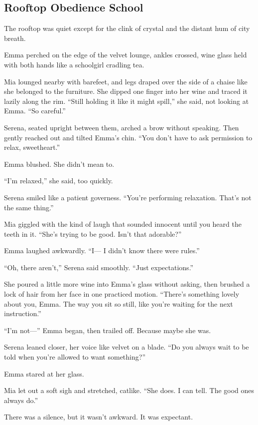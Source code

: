\subsection{Rooftop Obedience School}

The rooftop was quiet except for the clink of crystal and the distant hum of city breath.

Emma perched on the edge of the velvet lounge, ankles crossed, wine glass held with both 
hands like a schoolgirl cradling tea.

Mia lounged nearby with barefeet, and legs draped over the side of a chaise like she belonged to the furniture.
She dipped one finger into her wine and traced it lazily along the rim.
``Still holding it like it might spill,'' she said, not looking at Emma. ``So careful.''

Serena, seated upright between them, arched a brow without speaking. Then gently reached out and 
tilted Emma’s chin.
``You don’t have to ask permission to relax, sweetheart.''

Emma blushed. She didn’t mean to.

``I’m relaxed,'' she said, too quickly.

Serena smiled like a patient governess. ``You’re performing relaxation. That's not the same thing.''

Mia giggled with the kind of laugh that sounded innocent until you heard the teeth in it.
``She’s trying to be good. Isn’t that adorable?''

Emma laughed awkwardly. ``I— I didn’t know there were rules.''

``Oh, there aren’t,'' Serena said smoothly. ``Just expectations.''

She poured a little more wine into Emma’s glass without asking, then brushed a lock of hair from her 
face in one practiced motion.
``There’s something lovely about you, Emma. The way you sit so still, like you’re waiting for the 
next instruction.''

``I’m not—'' Emma began, then trailed off. Because maybe she was.

Serena leaned closer, her voice like velvet on a blade.
``Do you always wait to be told when you’re allowed to want something?''

Emma stared at her glass.

Mia let out a soft sigh and stretched, catlike. ``She does. I can tell. The good ones always do.''

There was a silence, but it wasn’t awkward. It was expectant.

